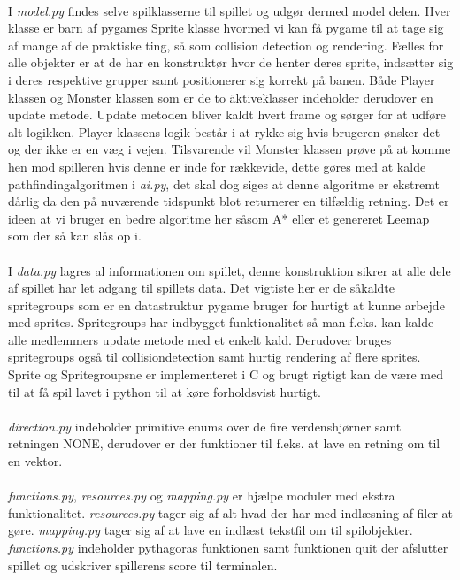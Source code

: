 \documentclass[10pt,a4paper,danish]{article}
\begin{document}
\paragraph{}
I \textit{model.py} findes selve spilklasserne til spillet og udgør dermed model delen. Hver klasse er barn af pygames Sprite klasse hvormed vi kan få pygame til at tage sig af mange af de praktiske ting, så som collision detection og rendering. Fælles for alle objekter er at de har en konstruktør hvor de henter deres sprite, indsætter sig i deres respektive grupper samt positionerer sig korrekt på banen. Både Player klassen og Monster klassen som er de to \"aktive\" klasser indeholder derudover en update metode. Update metoden bliver kaldt hvert frame og sørger for at udføre alt logikken. Player klassens logik består i at rykke sig hvis brugeren ønsker det og der ikke er en væg i vejen. Tilsvarende vil Monster klassen prøve på at komme hen mod spilleren hvis denne er inde for rækkevide, dette gøres med at kalde pathfindingalgoritmen i \textit{ai.py}, det skal dog siges at denne algoritme er ekstremt dårlig da den på nuværende tidspunkt blot returnerer en tilfældig retning. Det er ideen at vi bruger en bedre algoritme her såsom A* eller et genereret Leemap som der så kan slås op i.

\paragraph{}
I \textit{data.py} lagres al informationen om spillet, denne konstruktion sikrer at alle dele af spillet har let adgang til spillets data.
Det vigtiste her er de såkaldte spritegroups som er en datastruktur pygame bruger for hurtigt at kunne arbejde med sprites. Spritegroups har indbygget funktionalitet så man f.eks. kan kalde alle medlemmers update metode med et enkelt kald. Derudover bruges spritegroups også til collisiondetection samt hurtig rendering af flere sprites. Sprite og Spritegroupsne er implementeret i C og brugt rigtigt kan de være med til at få spil lavet i python til at køre forholdsvist hurtigt.

\paragraph{}
\textit{direction.py} indeholder primitive enums over de fire verdenshjørner samt retningen NONE, derudover er der funktioner til f.eks. at lave en retning om til en vektor.

\paragraph{}
\textit{functions.py}, \textit{resources.py} og \textit{mapping.py} er hjælpe moduler med ekstra funktionalitet. \textit{resources.py} tager sig af alt hvad der har med indlæsning af filer at gøre. \textit{mapping.py} tager sig af at lave en indlæst tekstfil om til spilobjekter. \textit{functions.py} indeholder pythagoras funktionen samt funktionen quit der afslutter spillet og udskriver spillerens score til terminalen.
\end{document}
